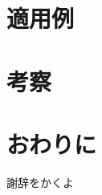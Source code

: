 \documentclass[uplatex, report, a4j, 10pt, dvipdfmx]{jsbook}
\begin{document}
\chapter{適用例}\label{cha:Indication}

\chapter{考察}\label{cha:Evaluation}

\chapter{おわりに} \label{cha:Conclusion}

%
\acknowledgment{}

謝辞をかくよ


%
%

%
\end{document}
